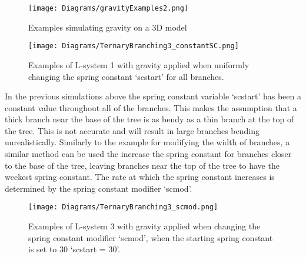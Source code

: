 \begin{figure}[htbp]
	{\centering
		\vspace{7px}
		\texttt{[image: Diagrams/gravityExamples2.png]}
		\label{3DAxisFigure} \label{Gravity applied to generated models}
		\caption{Examples simulating gravity on a 3D model}
	}
\end{figure}
\FloatBarrier



\begin{figure}[htbp]
	{\centering
		\vspace{7px}
		\texttt{[image: Diagrams/TernaryBranching3\_constantSC.png]}
		\caption{Examples of L-system 1 with gravity applied when uniformly changing the spring constant `scstart' for all branches.}
	}
\end{figure}
\FloatBarrier

\noindent
In the previous simulations above the spring constant variable `scstart' has been a constant value throughout all of the branches. This makes the assumption that a thick branch near the base of the tree is as bendy as a thin branch at the top of the tree. This is not accurate and will result in large branches bending unrealistically. Similarly to the example for modifying the width of branches, a similar method can be used the increase the spring constant for branches closer to the base of the tree, leaving branches near the top of the tree to have the weekest spring constant. The rate at which the spring constant increases is determined by the spring constant modifier `scmod'. 

\begin{figure}[htbp]
	{\centering
		\vspace{7px}
		\texttt{[image: Diagrams/TernaryBranching3\_scmod.png]}
		\caption{Examples of L-system 3 with gravity applied when changing the spring constant modifier `scmod', when the starting spring constant is set to 30 `scstart = 30'.}
	}
\end{figure}
\FloatBarrier



